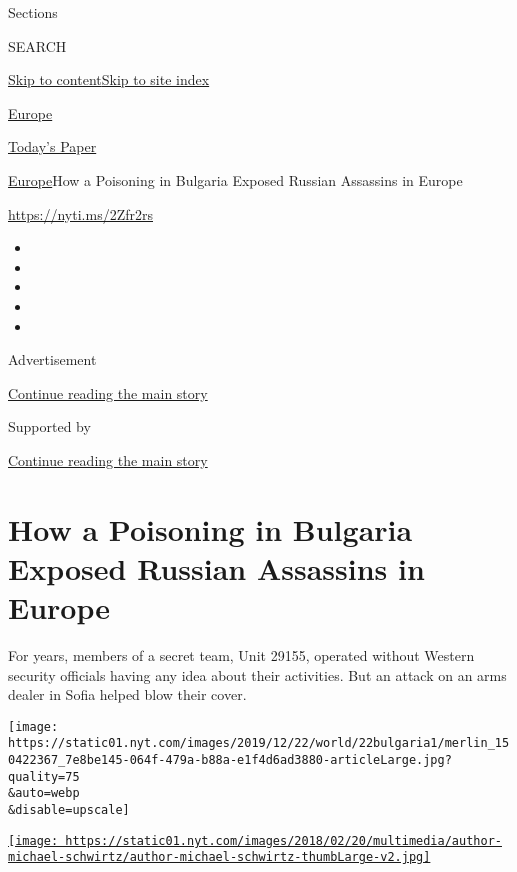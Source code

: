 Sections

SEARCH

\protect\hyperlink{site-content}{Skip to
content}\protect\hyperlink{site-index}{Skip to site index}

\href{https://www.nytimes.com/section/world/europe}{Europe}

\href{https://myaccount.nytimes.com/auth/login?response_type=cookie\&client_id=vi}{}

\href{https://www.nytimes.com/section/todayspaper}{Today's Paper}

\href{/section/world/europe}{Europe}\textbar{}How a Poisoning in
Bulgaria Exposed Russian Assassins in Europe

\url{https://nyti.ms/2Zfr2rs}

\begin{itemize}
\item
\item
\item
\item
\item
\end{itemize}

Advertisement

\protect\hyperlink{after-top}{Continue reading the main story}

Supported by

\protect\hyperlink{after-sponsor}{Continue reading the main story}

\hypertarget{how-a-poisoning-in-bulgaria-exposed-russian-assassins-in-europe}{%
\section{How a Poisoning in Bulgaria Exposed Russian Assassins in
Europe}\label{how-a-poisoning-in-bulgaria-exposed-russian-assassins-in-europe}}

For years, members of a secret team, Unit 29155, operated without
Western security officials having any idea about their activities. But
an attack on an arms dealer in Sofia helped blow their cover.

\texttt{[image: https://static01.nyt.com/images/2019/12/22/world/22bulgaria1/merlin\_150422367\_7e8be145-064f-479a-b88a-e1f4d6ad3880-articleLarge.jpg?quality=75\\\&auto=webp\\\&disable=upscale]}

\href{https://www.nytimes.com/by/michael-schwirtz}{\texttt{[image: https://static01.nyt.com/images/2018/02/20/multimedia/author-michael-schwirtz/author-michael-schwirtz-thumbLarge-v2.jpg]}}

